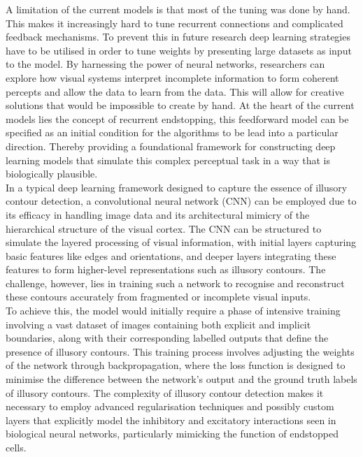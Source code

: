 \documentclass[12pt]{article}
\begin{document}
A limitation of the current models is that most of the tuning was done by hand. This makes it increasingly hard to tune recurrent connections and complicated feedback mechanisms. To prevent this in future research deep learning strategies have to be utilised in order to tune weights by presenting large datasets as input to the model. By harnessing the power of neural networks, researchers can explore how visual systems interpret incomplete information to form coherent percepts and allow the data to learn from the data. This will allow for creative solutions that would be impossible to create by hand. At the heart of the current models lies the concept of recurrent endstopping, this feedforward model can be specified as an initial condition for the algorithms to be lead into a particular direction. Thereby providing a foundational framework for constructing deep learning models that simulate this complex perceptual task in a way that is biologically plausible.
\\
In a typical deep learning framework designed to capture the essence of illusory contour detection, a convolutional neural network (CNN) can be employed due to its efficacy in handling image data and its architectural mimicry of the hierarchical structure of the visual cortex. The CNN can be structured to simulate the layered processing of visual information, with initial layers capturing basic features like edges and orientations, and deeper layers integrating these features to form higher-level representations such as illusory contours. The challenge, however, lies in training such a network to recognise and reconstruct these contours accurately from fragmented or incomplete visual inputs.
\\
To achieve this, the model would initially require a phase of intensive training involving a vast dataset of images containing both explicit and implicit boundaries, along with their corresponding labelled outputs that define the presence of illusory contours. This training process involves adjusting the weights of the network through backpropagation, where the loss function is designed to minimise the difference between the network's output and the ground truth labels of illusory contours. The complexity of illusory contour detection makes it necessary to employ advanced regularisation techniques and possibly custom layers that explicitly model the inhibitory and excitatory interactions seen in biological neural networks, particularly mimicking the function of endstopped cells.\\
\end{document}

